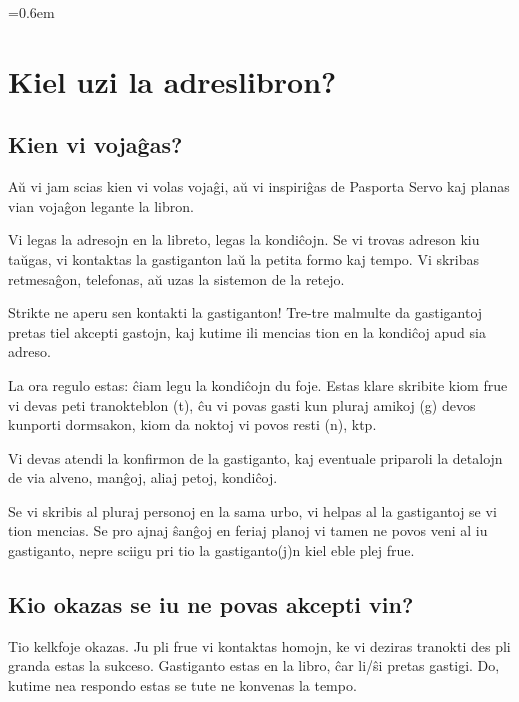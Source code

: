 {
  \titleformat{\section}[block]{}{}{0pt}{\huge\textbf}
  \parskip=0.6em

\section{Kiel uzi la adreslibron?}

\subsection{Kien vi vojaĝas?}

Aŭ vi jam scias kien vi volas vojaĝi, aŭ vi inspiriĝas de Pasporta Servo
kaj planas vian vojaĝon legante la libron.

Vi legas la adresojn en la libreto, legas la kondiĉojn. Se vi trovas
adreson kiu taŭgas, vi kontaktas la gastiganton laŭ la petita formo kaj
tempo. Vi skribas retmesaĝon, telefonas, aŭ uzas la sistemon de la
retejo.

Strikte ne aperu sen kontakti la gastiganton! Tre-tre malmulte da
gastigantoj pretas tiel akcepti gastojn, kaj kutime ili mencias tion en
la kondiĉoj apud sia adreso.

La ora regulo estas: {\semibold ĉiam legu la kondiĉojn du foje}. Estas klare
skribite kiom frue vi devas peti tranokteblon (t), ĉu vi povas gasti kun
pluraj amikoj (g) devos kunporti dormsakon, kiom da noktoj vi povos
resti (n), ktp.

Vi devas atendi la konfirmon de la gastiganto, kaj eventuale priparoli
la detalojn de via alveno, manĝoj, aliaj petoj, kondiĉoj.

Se vi skribis al pluraj personoj en la sama urbo, vi helpas al la
gastigantoj se vi tion mencias. Se pro ajnaj ŝanĝoj en feriaj planoj vi
tamen ne povos veni al iu gastiganto, nepre sciigu pri tio la
gastiganto(j)n kiel eble plej frue.

\subsection{Kio okazas se iu ne povas akcepti vin?}

Tio kelkfoje okazas. Ju pli frue vi kontaktas homojn, ke vi deziras
tranokti des pli granda estas la sukceso. Gastiganto estas en la libro, ĉar
li/ŝi pretas gastigi. Do, kutime nea respondo estas se tute ne konvenas la
tempo.

}
